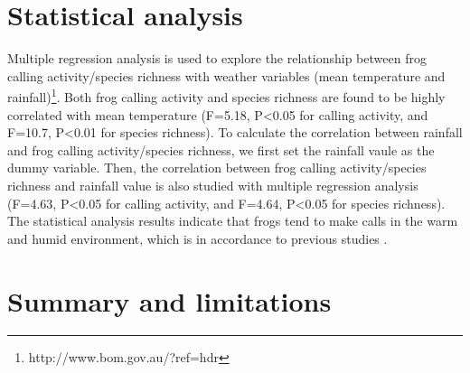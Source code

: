 \section{Statistical analysis}
Multiple regression analysis is used to explore the relationship between frog calling activity/species richness with weather variables (mean temperature and rainfall)\footnote[5] {http://www.bom.gov.au/?ref=hdr}. Both frog calling activity and species richness are found to be highly correlated with mean temperature (F=5.18, P\textless0.05 for calling activity, and F=10.7, P\textless0.01 for species richness). To calculate the correlation between rainfall and frog calling activity/species richness, we first set the rainfall vaule as the dummy variable. Then, the correlation between frog calling activity/species richness and rainfall value is also studied with multiple regression analysis (F=4.63, P\textless0.05 for calling activity, and F=4.64, P\textless0.05 for species richness). The statistical analysis results indicate that frogs tend to make calls in the warm and humid environment, which is in accordance to previous studies \citep{akmentins2015patterns, canavero2008calling}.


\section{Summary and limitations}






